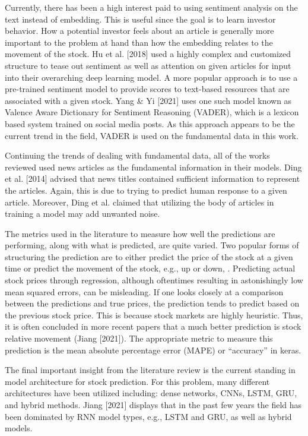 \documentclass{article}
\begin{document}
Currently, there has been a high interest paid to using sentiment
analysis on the text instead of embedding. This is useful since the goal
is to learn investor behavior. How a potential investor feels about
an article is generally more important to the problem at hand than how the
embedding relates to the movement of the stock.
Hu et al. [2018] used a highly complex and customized structure
to tease out sentiment as well as attention on given articles for input into
their overarching deep learning model. A more popular approach is to use a
pre-trained sentiment model to provide scores to text-based resources that are
associated with a given stock. Yang \& Yi [2021] uses one such model known as Valence Aware
Dictionary for Sentiment Reasoning (VADER), which is a lexicon based system trained
on social media posts. As this approach appears to be the current trend in the field,
VADER is used on the fundamental data in this work.

Continuing the trends of dealing with fundamental data, all of the works
reviewed used news articles as the fundamental information in their models.
Ding et al. [2014] advised that news titles
contained sufficient information to represent the articles.
Again, this is due
to trying to predict human response to a given article.
Moreover, Ding et al. claimed that utilizing the body of articles in training
a model may add unwanted noise.

The metrics used in the literature to measure how well the predictions are
performing, along with what is predicted, are quite varied.
Two popular forms of structuring the prediction are to either predict the price of
the stock at a given time or predict the movement of the stock, e.g., up or down,
. Predicting actual stock prices through regression, although
oftentimes resulting in astonishingly low mean squared errors, can be
misleading. If one looks closely at a comparison between the
predictions and true prices, the prediction
tends to predict based on the previous stock price. This is because stock
markets are highly heuristic. Thus, it is often concluded in more recent papers
that a much better prediction is stock relative movement (Jiang [2021]).
The appropriate metric to measure this prediction is the mean absolute
percentage error (MAPE) or ``accuracy'' in keras.

The final important insight from the literature review is the current standing
in model architecture for stock prediction. For this problem, many different
architectures have been utilized including: dense networks, CNNs, LSTM, GRU, 
and hybrid methods. Jiang [2021] displays that in the past few years the field has
been dominated by RNN model types, e.g., LSTM and GRU, as well as hybrid models.
\end{document}
